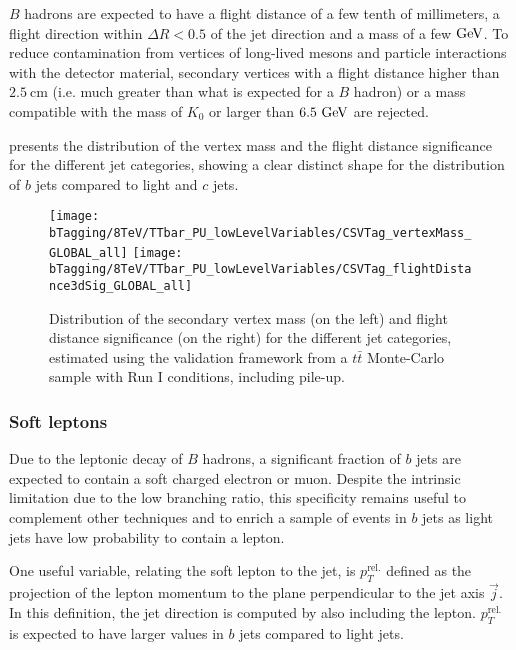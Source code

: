     $B$ hadrons are expected to have a flight distance of a few tenth of
    millimeters, a flight direction within $\Delta R < 0.5$ of the jet direction
    and a mass of a few$~\text{GeV}$.  To reduce contamination from vertices of
    long-lived mesons and particle interactions with the detector material,
    secondary vertices with a flight distance higher than $2.5~\text{cm}$ (i.e.
    much greater than what is expected for a $B$ hadron) or a mass compatible
    with the mass of $K_0$ or larger than $6.5~\text{GeV}$ are rejected.

     presents the distribution of the
    vertex mass and the flight distance significance for the different jet
    categories, showing a clear distinct shape for the distribution of $b$ jets
    compared to light and $c$ jets.

    \begin{figure}[th!]
        \centering
        \begin{minipage}{\textwidth}
        \texttt{[image: bTagging/8TeV/TTbar\_PU\_lowLevelVariables/CSVTag\_vertexMass\_GLOBAL\_all]}
        \texttt{[image: bTagging/8TeV/TTbar\_PU\_lowLevelVariables/CSVTag\_flightDistance3dSig\_GLOBAL\_all]}
        \end{minipage}
        \caption{Distribution of the secondary vertex mass (on the left) and
        flight distance significance (on the right) for the different jet
        categories, estimated using the validation framework from a $t\bar{t}$
        Monte-Carlo sample with Run I conditions, including pile-up.}
        \label{fig:bTagging/secondaryVertex}
    \end{figure}

    \subsubsection{Soft leptons}

    Due to the leptonic decay of $B$ hadrons, a significant fraction of $b$ jets
    are expected to contain a soft charged electron or muon. Despite the
    intrinsic limitation due to the low branching ratio, this specificity
    remains useful to complement other techniques and to enrich a sample of
    events in $b$ jets as light jets have low probability to contain a lepton.

    One useful variable, relating the soft lepton to the jet, is
    $p_T^\text{rel.}$ defined as the projection of the lepton momentum to the
    plane perpendicular to the jet axis $\vec{j}$. In this definition, the jet
    direction is computed by also including the lepton.  $p_T^\text{rel.}$ is
    expected to have larger values in $b$ jets compared to light jets.

